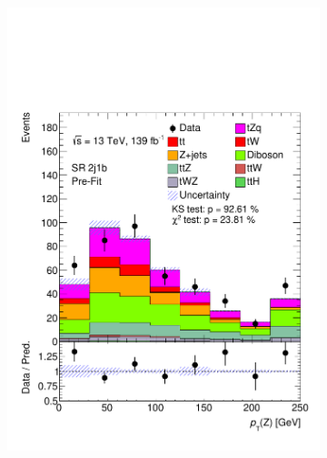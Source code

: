 \begin{figure}[!h]
\begin{subfigure}[b]{0.33\linewidth}
    \includegraphics[width=\linewidth]{ubonn-thesis/Chapters/Chapters_06/Figure/Input_distribution/SR_2j1b_Z_pt.pdf} 
  \end{subfigure} 
  \begin{subfigure}[b]{0.33\linewidth}
    \centering

\end{subfigure}
\end{figure}
